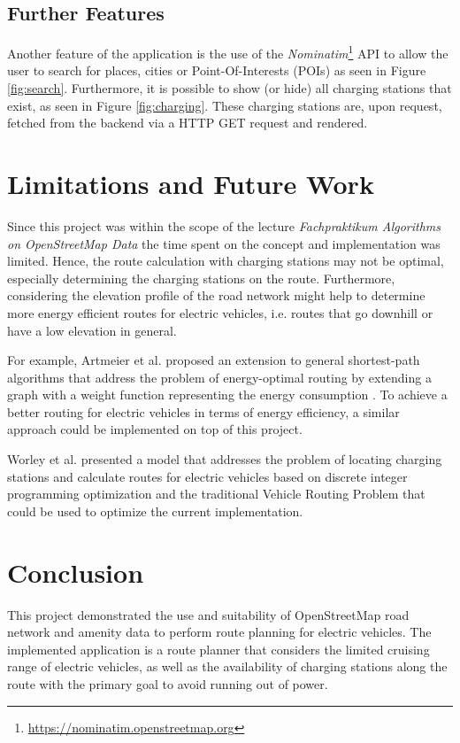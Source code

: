 \documentclass[a4paper]{article}
\begin{document}
\subsection{Further Features}
Another feature of the application is the use of the \textit{Nominatim}\footnote{\url{https://nominatim.openstreetmap.org}} API to allow the user to search for places, cities or Point-Of-Interests (POIs) as seen in Figure \ref{fig:search}.
Furthermore, it is possible to show (or hide) all charging stations that exist, as seen in Figure \ref{fig:charging}.
These charging stations are, upon request, fetched from the backend via a HTTP GET request and rendered.
\section{Limitations and Future Work}
Since this project was within the scope of the lecture \textit{Fachpraktikum Algorithms on OpenStreetMap Data} the time spent on the concept and implementation was limited.
Hence, the route calculation with charging stations may not be optimal, especially determining the charging stations on the route.
Furthermore, considering the elevation profile of the road network might help to determine more energy efficient routes for electric vehicles, i.e. routes that go downhill or have a low elevation in general.\par\medskip
For example, Artmeier et al. \cite{Artmeier2010} proposed an extension to general shortest-path algorithms that address the problem of energy-optimal routing by extending a graph with a weight function representing the energy consumption \cite{Artmeier2010}.
To achieve a better routing for electric vehicles in terms of energy efficiency, a similar approach could be implemented on top of this project.\par\medskip
Worley et al. \cite{Worley2012} presented a model that addresses the problem of locating charging stations and calculate routes for electric vehicles based on discrete integer programming optimization and the traditional Vehicle Routing Problem \cite{Worley2012} that could be used to optimize the current implementation.
\section{Conclusion}
This project demonstrated the use and suitability of OpenStreetMap road network and amenity data to perform route planning for electric vehicles.
The implemented application is a route planner that considers the limited cruising range of electric vehicles, as well as the availability of charging stations along the route with the primary goal to avoid running out of power.


\end{document}
